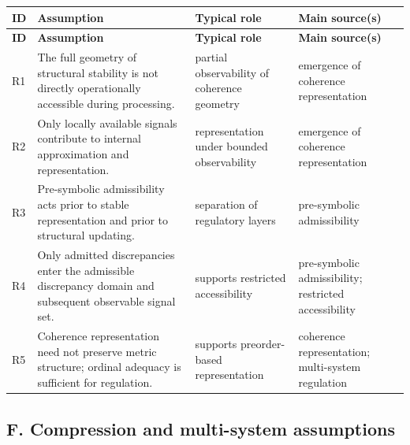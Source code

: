 \documentclass[11pt,a4paper]{article}
\begin{document}
	\begin{longtable}{>{\RaggedRight\arraybackslash}p{}
			>{\RaggedRight\arraybackslash}p{}
			>{\RaggedRight\arraybackslash}p{}
			>{\RaggedRight\arraybackslash}p{}}
		\toprule
		\textbf{ID} & \textbf{Assumption} & \textbf{Typical role} & \textbf{Main source(s)} \\
		\midrule
		\endfirsthead
		\toprule
		\textbf{ID} & \textbf{Assumption} & \textbf{Typical role} & \textbf{Main source(s)} \\
		\midrule
		\endhead
		
		R1 & The full geometry of structural stability is not directly operationally accessible during processing. & partial observability of coherence geometry & emergence of coherence representation \\
		
		R2 & Only locally available signals contribute to internal approximation and representation. & representation under bounded observability & emergence of coherence representation \\
		
		R3 & Pre-symbolic admissibility acts prior to stable representation and prior to structural updating. & separation of regulatory layers & pre-symbolic admissibility \\
		
		R4 & Only admitted discrepancies enter the admissible discrepancy domain and subsequent observable signal set. & supports restricted accessibility & pre-symbolic admissibility; restricted accessibility \\
		
		R5 & Coherence representation need not preserve metric structure; ordinal adequacy is sufficient for regulation. & supports preorder-based representation & coherence representation; multi-system regulation \\
		
		\bottomrule
	\end{longtable}
	
	\subsection{F. Compression and multi-system assumptions}
	
\end{document}
